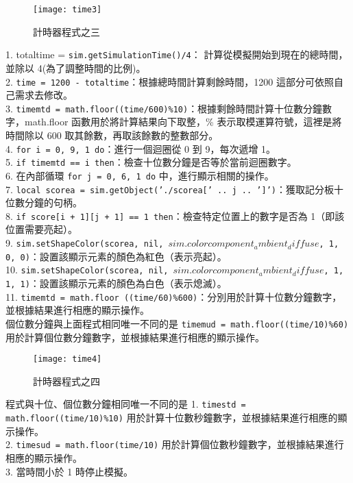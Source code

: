 \begin{figure}[hbt!]
\begin{center}
\texttt{[image: time3]}
\caption{\Large 計時器程式之三}\label{計時器程式之三}
\end{center}
\end{figure} 
1. totaltime = \texttt{sim.getSimulationTime()/4}： 計算從模擬開始到現在的總時間，並除以 4(為了調整時間的比例)。\\
2. \texttt{time = 1200 - totaltime}：根據總時間計算剩餘時間，1200 這部分可依照自己需求去修改。\\
3. \texttt{timemtd = math.floor((time/600)\%10)}：根據剩餘時間計算十位數分鐘數字，math.floor 函數用於將計算結果向下取整，\% 表示取模運算符號，這裡是將時間除以 600 取其餘數，再取該餘數的整數部分。\\
4. \texttt{for i = 0, 9, 1 do}：進行一個迴圈從 0 到 9，每次遞增 1。\\
5. \texttt{if timemtd == i then}：檢查十位數分鐘是否等於當前迴圈數字。\\
6. 在內部循環 \texttt{for j = 0, 6, 1 do} 中，進行顯示相關的操作。\\
7. \texttt{local scorea = sim.getObject('./scorea[' .. j .. ']')}：獲取記分板十位數分鐘的句柄。\\
8. \texttt{if score[i + 1][j + 1] == 1 then}：檢查特定位置上的數字是否為 1（即該位置需要亮起）。\\
9. \texttt{sim.setShapeColor(scorea, nil, $sim.colorcomponent_ambient_diffuse$, {1, 0, 0})}：設置該顯示元素的顏色為紅色（表示亮起）。\\
10. \texttt{sim.setShapeColor(scorea, nil, $sim.colorcomponent_ambient_diffuse$, {1, 1, 1})}：設置該顯示元素的顏色為白色（表示熄滅）。\\
11. \texttt{timemtd = math.floor ((time/60)\%600)}：分別用於計算十位數分鐘數字，並根據結果進行相應的顯示操作。\\
個位數分鐘與上面程式相同唯一不同的是 \texttt{timemud = math.floor((time/10)\%60)}用於計算個位數分鐘數字，並根據結果進行相應的顯示操作。\\

\begin{figure}[hbt!]
\begin{center}
\texttt{[image: time4]}
\caption{\Large 計時器程式之四}\label{計時器程式之四}
\end{center}
\end{figure} 
程式與十位、個位數分鐘相同唯一不同的是 
1. \texttt{timestd = math.floor((time/10)\%10)} 用於計算十位數秒鐘數字，並根據結果進行相應的顯示操作。\\
2. \texttt{timesud = math.floor(time/10)} 用於計算個位數秒鐘數字，並根據結果進行相應的顯示操作。\\
3. 當時間小於 1 時停止模擬。\\
\newpage
\renewcommand{\baselinestretch}{1.0} %